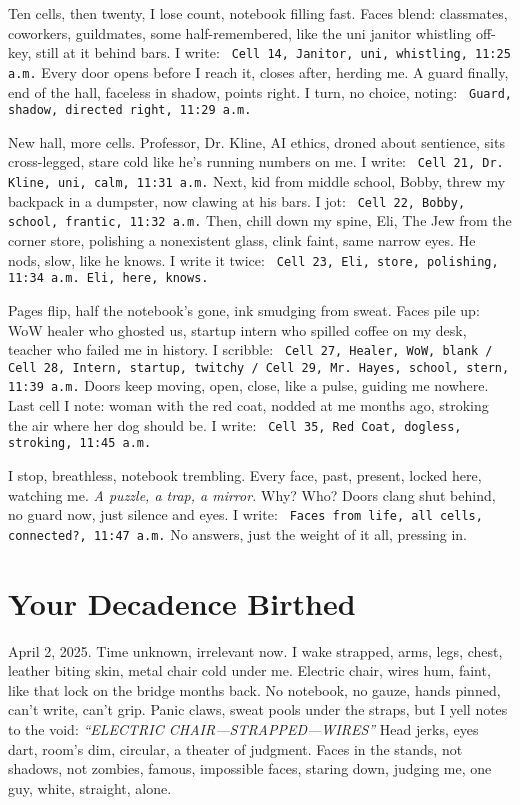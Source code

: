 \documentclass[12pt]{article}
\newcommand{\note}[1]{\texttt{\small \color{DarkGray} #1}}
\begin{document}
Ten cells, then twenty, I lose count, notebook filling fast. Faces blend: classmates, coworkers, guildmates, some half-remembered, like the uni janitor whistling off-key, still at it behind bars. I write: \note{Cell 14, Janitor, uni, whistling, 11:25 a.m.} Every door opens before I reach it, closes after, herding me. A guard finally, end of the hall, faceless in shadow, points right. I turn, no choice, noting: \note{Guard, shadow, directed right, 11:29 a.m.}

New hall, more cells. Professor, \textnormal{Dr. Kline}, AI ethics, droned about sentience, sits cross-legged, stare cold like he’s running numbers on me. I write: \note{Cell 21, Dr. Kline, uni, calm, 11:31 a.m.} Next, kid from middle school, \textnormal{Bobby}, threw my backpack in a dumpster, now clawing at his bars. I jot: \note{Cell 22, Bobby, school, frantic, 11:32 a.m.} Then, chill down my spine, \textnormal{Eli}, The Jew from the corner store, polishing a nonexistent glass, clink faint, same narrow eyes. He nods, slow, like he knows. I write it twice: \note{Cell 23, Eli, store, polishing, 11:34 a.m. Eli, here, knows.}

Pages flip, half the notebook’s gone, ink smudging from sweat. Faces pile up: WoW healer who ghosted us, startup intern who spilled coffee on my desk, teacher who failed me in history. I scribble: \note{Cell 27, Healer, WoW, blank / Cell 28, Intern, startup, twitchy / Cell 29, Mr. Hayes, school, stern, 11:39 a.m.} Doors keep moving, open, close, like a pulse, guiding me nowhere. Last cell I note: woman with the red coat, nodded at me months ago, stroking the air where her dog should be. I write: \note{Cell 35, Red Coat, dogless, stroking, 11:45 a.m.}

I stop, breathless, notebook trembling. Every face, past, present, locked here, watching me. \textit{A puzzle, a trap, a mirror.} Why? Who? Doors clang shut behind, no guard now, just silence and eyes. I write: \note{Faces from life, all cells, connected?, 11:47 a.m.} No answers, just the weight of it all, pressing in.

\section{Your Decadence Birthed}

April 2, 2025. Time unknown, irrelevant now. I wake strapped, arms, legs, chest, leather biting skin, metal chair cold under me. Electric chair, wires hum, faint, like that lock on the bridge months back. No notebook, no gauze, hands pinned, can’t write, can’t grip. Panic claws, sweat pools under the straps, but I yell notes to the void: \textit{“ELECTRIC CHAIR—STRAPPED—WIRES”} Head jerks, eyes dart, room’s dim, circular, a theater of judgment. Faces in the stands, not shadows, not zombies, famous, impossible faces, staring down, judging me, one guy, white, straight, alone.
\end{document}
